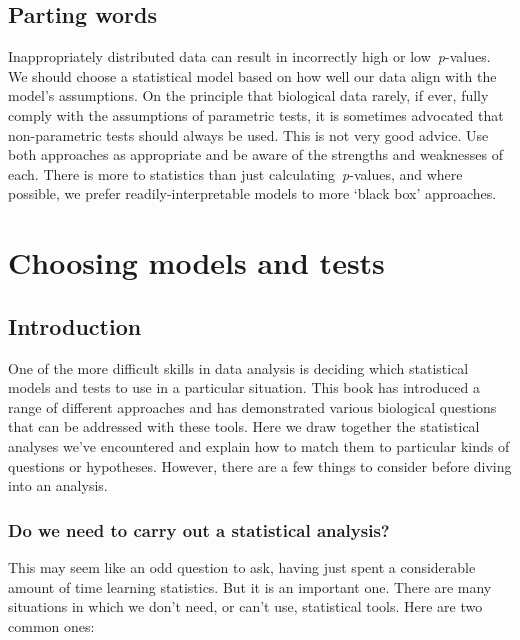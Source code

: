 \documentclass[
]{book}
\begin{document}
\hypertarget{parting-words}{%
\section{Parting words}\label{parting-words}}

Inappropriately distributed data can result in incorrectly high or low~\emph{p}-values. We should choose a statistical model based on how well our data align with the model's assumptions. On the principle that biological data rarely, if ever, fully comply with the assumptions of parametric tests, it is sometimes advocated that non-parametric tests should always be used. This is not very good advice. Use both approaches as appropriate and be aware of the strengths and weaknesses of each. There is more to statistics than just calculating~\emph{p}-values, and where possible, we prefer readily-interpretable models to more `black box' approaches.

\hypertarget{appendix-supplementary-material}{%
\appendix}


\hypertarget{choosing-models-and-tests}{%
\chapter{Choosing models and tests}\label{choosing-models-and-tests}}

\hypertarget{intro}{%
\section{Introduction}\label{intro}}

One of the more difficult skills in data analysis is deciding which statistical models and tests to use in a particular situation. This book has introduced a range of different approaches and has demonstrated various biological questions that can be addressed with these tools. Here we draw together the statistical analyses we've encountered and explain how to match them to particular kinds of questions or hypotheses. However, there are a few things to consider before diving into an analysis.

\hypertarget{do-we-need-to-carry-out-a-statistical-analysis}{%
\subsection{Do we need to carry out a statistical analysis?}\label{do-we-need-to-carry-out-a-statistical-analysis}}

This may seem like an odd question to ask, having just spent a considerable amount of time learning statistics. But it is an important one. There are many situations in which we don't need, or can't use, statistical tools. Here are two common ones:
\end{document}
